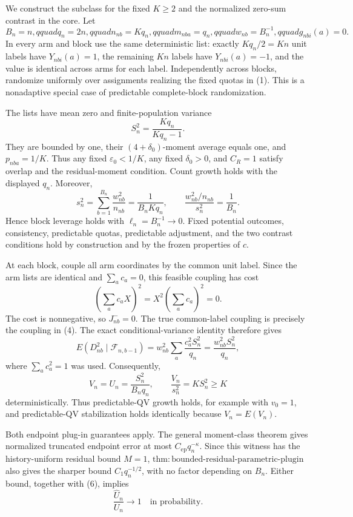 We construct the subclass for the fixed \(K\ge2\) and the normalized zero-sum contrast in the core. Let
\[
B_n=n,qquad q_n=2n,qquad n_{nb}=Kq_n,qquad
m_{nba}=q_n,qquad w_{nb}=B_n^{-1},qquad g_{nbi}(a)=0.
\tag{1}
\]
In every arm and block use the same deterministic list: exactly \(Kq_n/2=Kn\) unit labels have \(Y_{nbi}(a)=1\), the remaining \(Kn\) labels have \(Y_{nbi}(a)=-1\), and the value is identical across arms for each label. Independently across blocks, randomize uniformly over assignments realizing the fixed quotas in (1). This is a nonadaptive special case of predictable complete-block randomization.

The lists have mean zero and finite-population variance
\[
S_n^2=\frac{Kq_n}{Kq_n-1}.
\tag{2}
\]
They are bounded by one, their \((4+\delta_0)\)-moment average equals one, and \(p_{nba}=1/K\). Thus any fixed \(\varepsilon_0<1/K\), any fixed \(\delta_0>0\), and \(C_R=1\) satisfy overlap and the residual-moment condition. Count growth holds with the displayed \(q_n\). Moreover,
\[
s_n^2=\sum_{b=1}^{B_n}\frac{w_{nb}^2}{n_{nb}}
=\frac1{B_nKq_n},
\qquad
\frac{w_{nb}^2/n_{nb}}{s_n^2}=\frac1{B_n}.
\tag{3}
\]
Hence block leverage holds with \(\ell_n=B_n^{-1}\to0\). Fixed potential outcomes, consistency, predictable quotas, predictable adjustment, and the two contrast conditions hold by construction and by the frozen properties of \(c\).

At each block, couple all arm coordinates by the common unit label. Since the arm lists are identical and \(\sum_ac_a=0\), this feasible coupling has cost
\[
\left(\sum_ac_aX\right)^2=X^2\left(\sum_ac_a\right)^2=0.
\tag{4}
\]
The cost is nonnegative, so \(J_{nb}^{-}=0\). The true common-label coupling is precisely the coupling in (4). The exact conditional-variance identity therefore gives
\[
E(D_{nb}^2\mid\mathcal F_{n,b-1})
=w_{nb}^2\sum_a\frac{c_a^2S_n^2}{q_n}
=\frac{w_{nb}^2S_n^2}{q_n},
\tag{5}
\]
where \(\sum_ac_a^2=1\) was used. Consequently,
\[
V_n=U_n=\frac{S_n^2}{B_nq_n},
\qquad
\frac{V_n}{s_n^2}=KS_n^2\ge K
\tag{6}
\]
deterministically. Thus predictable-QV growth holds, for example with \(v_0=1\), and predictable-QV stabilization holds identically because \(V_n=E(V_n)\).

Both endpoint plug-in guarantees apply. The general moment-class theorem gives normalized truncated endpoint error at most \(C_{\mathrm{ep}}q_n^{-\kappa}\). Since this witness has the history-uniform residual bound \(M=1\), \(\mathrm{thm:bounded\text{-}residual\text{-}parametric\text{-}plugin}\) also gives the sharper bound \(C_1q_n^{-1/2}\), with no factor depending on \(B_n\). Either bound, together with (6), implies
\[
\frac{\widehat U_n}{U_n}\longrightarrow1
\quad\text{in probability}.
\tag{7}
\]

